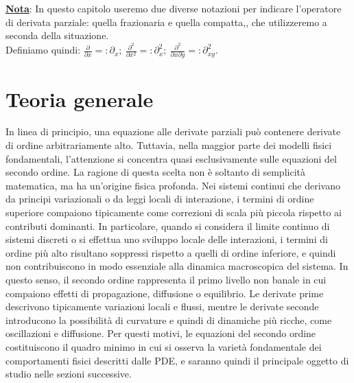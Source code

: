 \documentclass[a4paper,12pt]{report}
\begin{document}
\\
\\ \underline{\textbf{Nota}}: In questo capitolo useremo due diverse notazioni per indicare l'operatore di derivata parziale: quella frazionaria e quella compatta,, che utilizzeremo a seconda della situazione. 
\\Definiamo quindi: $\displaystyle\frac{\partial}{\partial x}=:\partial_x; \  \frac{\partial^2}{\partial x^2}=:\partial_x^2;\  \frac{\partial^2}{\partial x\partial y}=: \partial_{xy}^2$.



\newpage

\section{Teoria generale}

In linea di principio, una equazione alle derivate parziali può contenere derivate di ordine arbitrariamente alto. Tuttavia, nella maggior parte dei modelli fisici fondamentali, l’attenzione si concentra quasi esclusivamente sulle equazioni del secondo ordine. La ragione di questa scelta non è soltanto di semplicità matematica, ma ha un’origine fisica profonda. Nei sistemi continui che derivano da principi variazionali o da leggi locali di interazione, i termini di ordine superiore compaiono tipicamente come correzioni di scala più piccola rispetto ai contributi dominanti. In particolare, quando si considera il limite continuo di sistemi discreti o si effettua uno sviluppo locale delle interazioni, i termini di ordine più alto risultano soppressi rispetto a quelli di ordine inferiore, e quindi non contribuiscono in modo essenziale alla dinamica macroscopica del sistema. In questo senso, il secondo ordine rappresenta il primo livello non banale in cui compaiono effetti di propagazione, diffusione o equilibrio. Le derivate prime descrivono tipicamente variazioni locali e flussi, mentre le derivate seconde introducono la possibilità di curvature e quindi di dinamiche più ricche, come oscillazioni e diffusione. Per questi motivi, le equazioni del secondo ordine costituiscono il quadro minimo in cui si osserva la varietà fondamentale dei comportamenti fisici descritti dalle PDE, e saranno quindi il principale oggetto di studio nelle sezioni successive.
\end{document}
